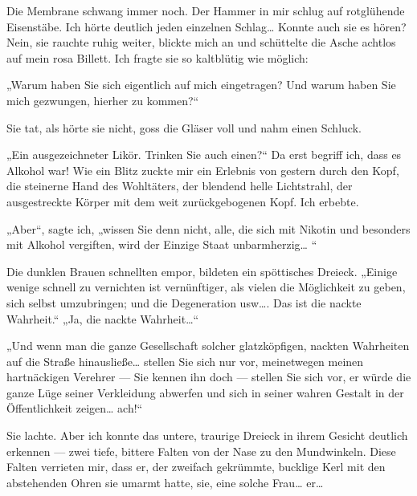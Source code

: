 Die Membrane schwang immer noch. Der Hammer in mir schlug auf
rotglühende Eisenstäbe. Ich hörte deutlich jeden einzelnen
Schlag\ldots{} Konnte auch sie es hören? Nein, sie rauchte ruhig weiter,
blickte mich an und schüttelte die Asche achtlos auf mein rosa
Billett. Ich fragte sie so kaltblütig wie möglich:

„Warum haben Sie sich eigentlich auf mich eingetragen? Und warum
haben Sie mich gezwungen, hierher zu kommen?“

Sie tat, als hörte sie nicht, goss die Gläser voll und nahm einen
Schluck.

„Ein ausgezeichneter Likör. Trinken Sie auch einen?“ Da erst
begriff ich, dass es Alkohol war! Wie ein Blitz zuckte mir ein
Erlebnis von gestern durch den Kopf, die steinerne Hand des
Wohltäters, der blendend helle Lichtstrahl, der ausgestreckte
Körper mit dem weit zurückgebogenen Kopf. Ich erbebte.

„Aber“, sagte ich, „wissen Sie denn nicht, alle, die sich mit
Nikotin und besonders mit Alkohol vergiften, wird der Einzige Staat
unbarmherzig\ldots{} “

Die dunklen Brauen schnellten empor, bildeten ein spöttisches
Dreieck. „Einige wenige schnell zu vernichten ist vernünftiger, als
vielen die Möglichkeit zu geben, sich selbst umzubringen; und die
Degeneration usw\ldots{}. Das ist die nackte Wahrheit.“ „Ja, die nackte
Wahrheit\ldots{}“

„Und wenn man die ganze Gesellschaft solcher glatzköpfigen, nackten
Wahrheiten auf die Straße hinausließe\ldots{} stellen Sie sich nur vor,
meinetwegen meinen hartnäckigen Verehrer — Sie kennen ihn doch —
stellen Sie sich vor, er würde die ganze Lüge seiner Verkleidung
abwerfen und sich in seiner wahren Gestalt in der Öffentlichkeit
zeigen\ldots{} ach!“

Sie lachte. Aber ich konnte das untere, traurige Dreieck in ihrem
Gesicht deutlich erkennen — zwei tiefe, bittere Falten von der Nase
zu den Mundwinkeln. Diese Falten verrieten mir, dass er, der
zweifach gekrümmte, bucklige Kerl mit den abstehenden Ohren sie
umarmt hatte, sie, eine solche Frau\ldots{} er\ldots{}

